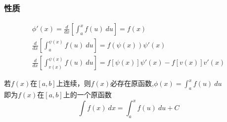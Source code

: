 \subsubsection{性质}
\begin{align}
	\phi'(x)=\frac{d}{dx}\left[\int_{a}^{x}f(u)\ du\right]=f(x)\label{integral_upper_limit_function_1}\\
	\frac{d}{dx}\left[\int_{a}^{\psi(x)}f(u)\ du\right]=f(\psi(x))\psi'(x)\label{integral_upper_limit_function_2}\\
	\frac{d}{dx}\left[\int_{v(x)}^{\psi(x)}f(u)\ du\right]=f\left[\psi(x)\right]\psi'(x)-f\left[v(x)\right]v'(x)\label{integral_upper_limit_function_3}
\end{align}

\begin{center}
		若$f(x)$在$\left[a,b\right]$上连续，则$f(x)$必存在原函数,$\phi(x)=\int_{a}^{x}f(u)\ du$\\
		即为$f(x)$在$\left[a,b\right]$上的一个原函数\\
		$$\int f(x)\ dx=\int_{a}^{x}f(u)\ du+C$$
\end{center}

